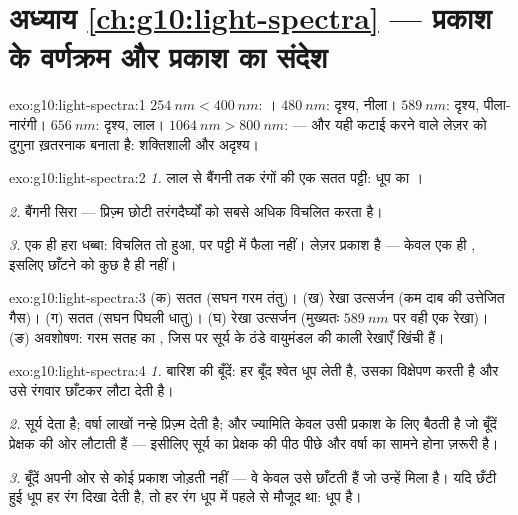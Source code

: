 \section*{अध्याय \ref{ch:g10:light-spectra} --- प्रकाश के वर्णक्रम और प्रकाश का संदेश}

\begin{solution}{exo:g10:light-spectra:1}
$\qty{254}{nm} < \qty{400}{nm}$: । $\qty{480}{nm}$: दृश्य, नीला। $\qty{589}{nm}$: दृश्य,
पीला-नारंगी। $\qty{656}{nm}$: दृश्य, लाल। $\qty{1064}{nm} > \qty{800}{nm}$:  --- और यही कटाई
करने वाले लेज़र को दुगुना ख़तरनाक बनाता है: शक्तिशाली और अदृश्य।
\end{solution}

\begin{solution}{exo:g10:light-spectra:2}
\emph{1.} लाल से बैंगनी तक रंगों की एक सतत पट्टी: धूप का
।

\emph{2.} बैंगनी सिरा --- प्रिज़्म छोटी तरंगदैर्घ्यों को सबसे
अधिक विचलित करता है।

\emph{3.} एक ही हरा धब्बा: विचलित तो हुआ, पर पट्टी में फैला नहीं। लेज़र
प्रकाश  है --- केवल एक ही , इसलिए
छाँटने को कुछ है ही नहीं।
\end{solution}

\begin{solution}{exo:g10:light-spectra:3}
(क) सतत (सघन गरम तंतु)। (ख) रेखा उत्सर्जन (कम दाब की उत्तेजित गैस)।
(ग) सतत (सघन पिघली धातु)। (घ) रेखा उत्सर्जन (मुख्यतः $\qty{589}{nm}$ पर वही एक
रेखा)। (ङ) अवशोषण: गरम सतह का , जिस पर सूर्य के
ठंडे वायुमंडल की काली रेखाएँ खिंची हैं।
\end{solution}

\begin{solution}{exo:g10:light-spectra:4}
\emph{1.} बारिश की बूँदें: हर बूँद श्वेत धूप लेती है, उसका विक्षेपण
करती है और उसे रंगवार छाँटकर लौटा देती है।

\emph{2.} सूर्य  देता है; वर्षा लाखों नन्हे
प्रिज़्म देती है; और ज्यामिति केवल उसी प्रकाश के लिए बैठती है जो बूँदें
प्रेक्षक की ओर लौटाती हैं --- इसीलिए सूर्य का प्रेक्षक की पीठ पीछे और
वर्षा का सामने होना ज़रूरी है।

\emph{3.} बूँदें अपनी ओर से कोई प्रकाश जोड़ती नहीं --- वे केवल उसे
छाँटती हैं जो उन्हें मिला है। यदि छँटी हुई धूप हर रंग दिखा देती है, तो
हर रंग धूप में पहले से मौजूद था: धूप  है।
\end{solution}

